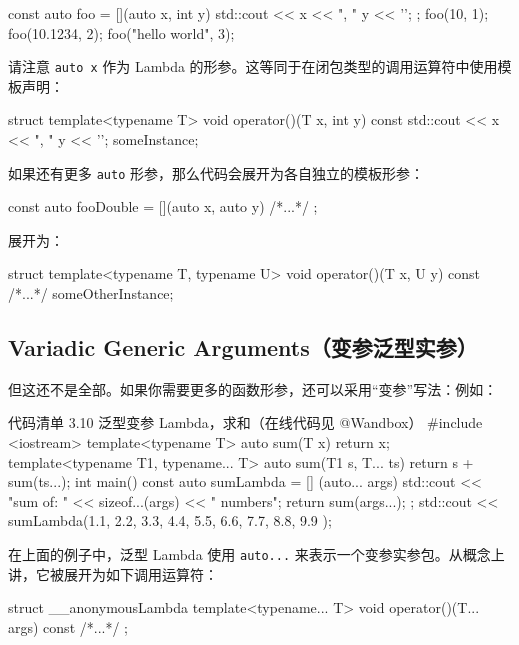 \begin{codebox}
const auto foo = [](auto x, int y) { std::cout << x << ", " y << '\n'; };
foo(10, 1);
foo(10.1234, 2);
foo("hello world", 3);
\end{codebox}

请注意 \texttt{auto x} 作为 Lambda 的形参。这等同于在闭包类型的调用运算符中使用模板声明：

\begin{codebox}
struct {
template<typename T>
void operator()(T x, int y) const {
std::cout << x << ", " y << '\n';
}
} someInstance;
\end{codebox}

如果还有更多 \texttt{auto} 形参，那么代码会展开为各自独立的模板形参：

\begin{codebox}
const auto fooDouble = [](auto x, auto y) { /*...*/ };
\end{codebox}

展开为：

\begin{codebox}
struct {
template<typename T, typename U>
void operator()(T x, U y) const { /*...*/ }
} someOtherInstance;
\end{codebox}

\subsection{Variadic Generic Arguments（变参泛型实参）}

但这还不是全部。如果你需要更多的函数形参，还可以采用“变参”写法：例如：

\begin{codeboxt}{代码清单 3.10 泛型变参 Lambda，求和（在线代码见 @Wandbox）}
#include <iostream>
template<typename T>
auto sum(T x) { return x; }
template<typename T1, typename... T>
auto sum(T1 s, T... ts) { return s + sum(ts...); }
int main() {
const auto sumLambda = [] (auto... args) {
std::cout << "sum of: " << sizeof...(args) << " numbers\n";
return sum(args...);
};
std::cout << sumLambda(1.1, 2.2, 3.3, 4.4, 5.5, 6.6, 7.7, 8.8, 9.9 );
}
\end{codeboxt}

在上面的例子中，泛型 Lambda 使用 \texttt{auto...} 来表示一个变参实参包。从概念上讲，它被展开为如下调用运算符：

\begin{codebox}
struct __anonymousLambda{
template<typename... T>
void operator()(T... args) const { /*...*/ }
};
\end{codebox}


